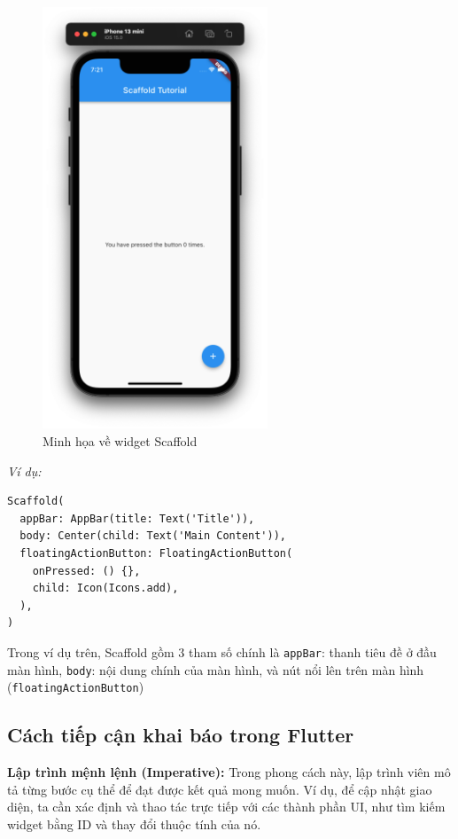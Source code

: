 \documentclass[../DoAn.tex]{subfiles}
\numberwithin{figure}{chapter}
\begin{document}
\begin{itemize}
\begin{figure}[H]
    \centering
    \includegraphics[width=0.6\textwidth]{Hinhve/Chuong5/scaffold.png}
    \caption{Minh họa về widget Scaffold}
    \label{fig:scaffold}
\end{figure}

\textit{Ví dụ:}
\begin{lstlisting}
Scaffold(
  appBar: AppBar(title: Text('Title')),
  body: Center(child: Text('Main Content')),
  floatingActionButton: FloatingActionButton(
    onPressed: () {},
    child: Icon(Icons.add),
  ),
)    
\end{lstlisting}

Trong ví dụ trên, Scaffold gồm 3 tham số chính là \texttt{appBar}: thanh tiêu đề ở đầu màn hình, \texttt{body}: nội dung chính của màn hình, và nút nổi lên trên màn hình (\texttt{floatingActionButton})
\end{itemize}

\subsection{Cách tiếp cận khai báo trong Flutter}

\textbf{Lập trình mệnh lệnh (Imperative):} Trong phong cách này, lập trình viên mô tả từng bước cụ thể để đạt được kết quả mong muốn. Ví dụ, để cập nhật giao diện, ta cần xác định và thao tác trực tiếp với các thành phần UI, như tìm kiếm widget bằng ID và thay đổi thuộc tính của nó.
\end{document}
